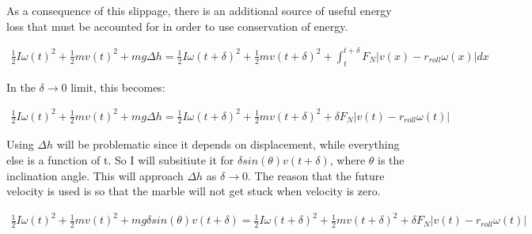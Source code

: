 \documentclass{article}
\begin{document}
As a consequence of this slippage, there is an additional source of useful energy loss
that must be accounted for in order to use conservation of energy.

\begin{align*}
    \frac{1}{2} I \omega(t)^{2} + \frac{1}{2} m v(t)^{2} + m g \Delta h = 
        \frac{1}{2} I \omega(t + \delta)^{2} + \frac{1}{2} m v(t + \delta)^{2} + \int_{t}^{t + \delta} F_{N} | v(x) - r_{roll} \omega(x) | dx 
\end{align*}

In the $\delta \to 0$ limit, this becomes:

\begin{align*}
    \frac{1}{2} I \omega(t)^{2} + \frac{1}{2} m v(t)^{2} + m g \Delta h = 
        \frac{1}{2} I \omega(t + \delta)^{2} + \frac{1}{2} m v(t + \delta)^{2} + \delta F_{N} | v(t) - r_{roll} \omega(t) | 
\end{align*}

Using $\Delta h$ will be problematic since it depends on displacement, while everything else is a function of t.
So I will subsitiute it for $\delta sin(\theta) v(t + \delta)$, where $\theta$ is the inclination angle.
This will approach $\Delta h$ as $\delta \to 0$. The reason that the future velocity is used is so that the
marble will not get stuck when velocity is zero.

\begin{align*}
    \frac{1}{2} I \omega(t)^{2} + \frac{1}{2} m v(t)^{2} + m g \delta sin(\theta) v(t + \delta) = 
        \frac{1}{2} I \omega(t + \delta)^{2} + \frac{1}{2} m v(t + \delta)^{2} + \delta F_{N} | v(t) - r_{roll} \omega(t) | 
\end{align*}
\end{document}
